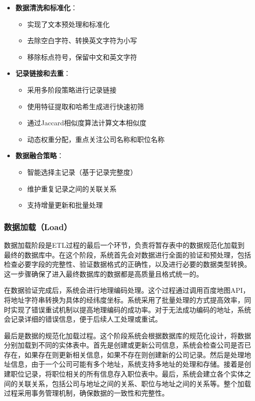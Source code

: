 \begin{itemize}
    \item \textbf{数据清洗和标准化}：
    \begin{itemize}
        \item 实现了文本预处理和标准化
        \item 去除空白字符、转换英文字符为小写
        \item 移除标点符号，保留中文和英文字符
    \end{itemize}
    
    \item \textbf{记录链接和去重}：
    \begin{itemize}
        \item 采用多阶段策略进行记录链接
        \item 使用特征提取和哈希生成进行快速初筛
        \item 通过Jaccard相似度算法计算文本相似度
        \item 动态权重分配，重点关注公司名称和职位名称
    \end{itemize}
    
    \item \textbf{数据融合策略}：
    \begin{itemize}
        \item 智能选择主记录（基于记录完整度）
        \item 维护重复记录之间的关联关系
        \item 支持增量更新和批量处理
    \end{itemize}
\end{itemize}

\subsubsection{数据加载（Load）}

数据加载阶段是ETL过程的最后一个环节，负责将暂存表中的数据规范化加载到最终的数据库中。在这个阶段，系统首先会对数据进行全面的验证和预处理，包括检查必要字段的完整性、验证数据格式的正确性，以及进行必要的数据类型转换。这一步骤确保了进入最终数据库的数据都是高质量且格式统一的。

在数据验证完成后，系统会进行地理编码处理。这个过程通过调用百度地图API，将地址字符串转换为具体的经纬度坐标。系统采用了批量处理的方式提高效率，同时实现了错误重试机制以提高地理编码的成功率。对于无法成功编码的地址，系统会记录详细的错误信息，便于后续人工处理或重试。

最后是数据的规范化加载过程。这个阶段系统会根据数据库的规范化设计，将数据分别加载到不同的实体表中。首先是创建或更新公司信息，系统会检查公司是否已存在，如果存在则更新相关信息，如果不存在则创建新的公司记录。然后是处理地址信息，由于一个公司可能有多个地址，系统支持多地址的处理和存储。接着是创建职位记录，将职位相关的所有信息存入职位表中。最后，系统会建立各个实体之间的关联关系，包括公司与地址之间的关系、职位与地址之间的关系等。整个加载过程采用事务管理机制，确保数据的一致性和完整性。


